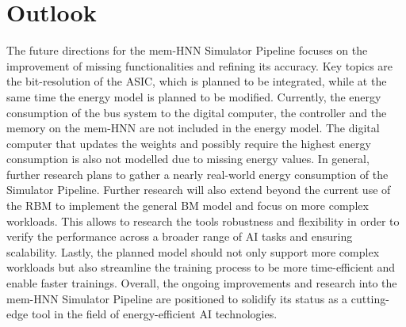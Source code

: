 \section{Outlook}
The future directions for the \ac{mem-HNN} Simulator Pipeline focuses on the improvement of missing functionalities and refining its accuracy. 
Key topics are the bit-resolution of the \ac{ASIC}, which is planned to be integrated, while at the same time the energy model is planned
to be modified.
Currently, the energy consumption of the bus system to the digital computer, the controller and the memory on the \ac{mem-HNN} 
are not included in the energy model.
The digital computer that updates the weights and possibly require the highest energy consumption is also not modelled due to missing energy values.
In general, further research plans to gather a nearly real-world energy consumption of the Simulator Pipeline.
Further research will also extend beyond the current use of the \ac{RBM} to implement the general \ac{BM} model and focus on more complex workloads.
This allows to research the tools robustness and flexibility in order to verify the performance across a broader range of AI tasks and ensuring scalability.
Lastly, the planned model should not only support more complex workloads but also streamline the training process to be more time-efficient and enable faster trainings.
Overall, the ongoing improvements and research into the \ac{mem-HNN} Simulator Pipeline are positioned to solidify its status as a cutting-edge tool in the field of energy-efficient AI technologies.